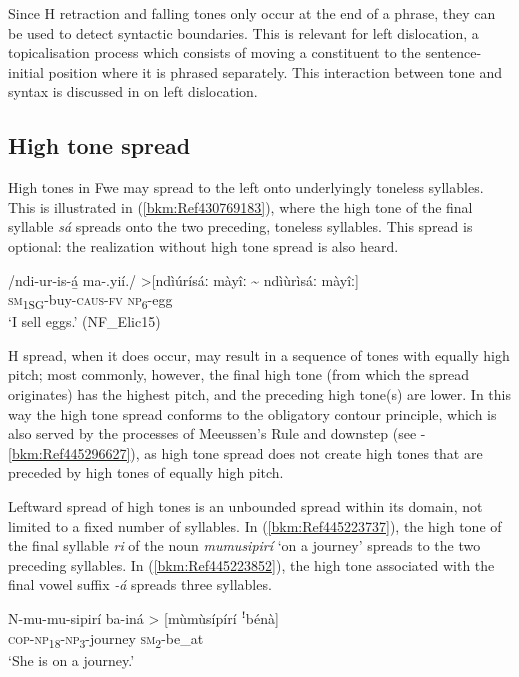 Since H retraction and falling tones only occur at the end of a phrase, they can be used to detect syntactic boundaries. This is relevant for left dislocation, a topicalisation process which consists of moving a constituent to the sentence-initial position where it is phrased separately. This interac\-tion between tone and syntax is discussed in  on left dislocation.

\subsection{High tone spread}
\label{bkm:Ref430865664}\hypertarget{Toc75352623}{}\label{bkm:Ref486506344}
High tones in Fwe may spread to the left onto underlyingly toneless syllables. This is illustrated in (\ref{bkm:Ref430769183}), where the high tone of the final syllable \textit{sá} spreads onto the two preceding, tone\-less syllables. This spread is optional: the realization without high tone spread is also heard.

\ea
\label{bkm:Ref430769183}
\gll /ndi-ur-is-á̲     ma-.yií./ >[ndìúrísáː màyîː {\textasciitilde} ndìùrìsáː màyîː]\\
\textsc{sm}\textsubscript{1SG}-buy-\textsc{caus}-\textsc{fv}  \textsc{np}\textsubscript{6}-egg\\
\glt ‘I sell eggs.’ (NF\_Elic15)
\z

H spread, when it does occur, may result in a sequence of tones with equally high pitch; most commonly, however, the final high tone (from which the spread originates) has the highest pitch, and the preceding high tone(s) are lower. In this way the high tone spread conforms to the obligatory contour principle, which is also served by the processes of Meeus\-sen’s Rule and downstep (see -\ref{bkm:Ref445296627}), as high tone spread does not create high tones that are preceded by high tones of equally high pitch.

Leftward spread of high tones is an unbounded spread within its domain, not limited to a fixed number of sylla\-bles. In (\ref{bkm:Ref445223737}), the high tone of the final syllable \textit{ri} of the noun \textit{mumusipirí} ‘on a journey’ spreads to the two preceding syllables. In (\ref{bkm:Ref445223852}), the high tone associated with the final vowel suffix \textit{-á} spreads three syllables.

\ea
\label{bkm:Ref445223737}
\gll N-mu-mu-sipirí    ba-iná > [mùmùsípírí ꜝbénà]\\
\textsc{cop}-\textsc{np}\textsubscript{18}-\textsc{np}\textsubscript{3}-journey  \textsc{sm}\textsubscript{2}-be\_at\\
\glt ‘She is on a journey.’
\z


